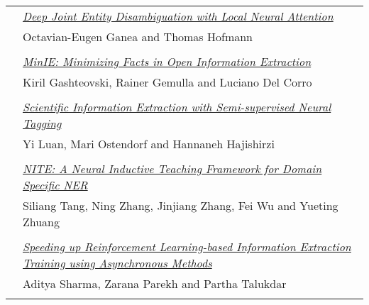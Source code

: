 \begin{tabular}{p{20mm}p{128mm}}
 & \hyperlink{page.2602}{\em Deep Joint Entity Disambiguation with Local Neural Attention}\\
         & Octavian-Eugen Ganea and Thomas Hofmann \\
\\

 & \hyperlink{page.2613}{\em MinIE: Minimizing Facts in Open Information Extraction}\\
         & Kiril Gashteovski, Rainer Gemulla and Luciano Del Corro \\
\\

 & \hyperlink{page.2624}{\em Scientific Information Extraction with Semi-supervised Neural Tagging}\\
         & Yi Luan, Mari Ostendorf and Hannaneh Hajishirzi \\
\\

 & \hyperlink{page.2635}{\em NITE: A Neural Inductive Teaching Framework for Domain Specific NER}\\
         & Siliang Tang, Ning Zhang, Jinjiang Zhang, Fei Wu and Yueting Zhuang \\
\\

 & \hyperlink{page.2641}{\em Speeding up Reinforcement Learning-based Information Extraction Training using Asynchronous Methods}\\
         & Aditya Sharma, Zarana Parekh and Partha Talukdar \\
\\

\end{tabular}
\newpage
